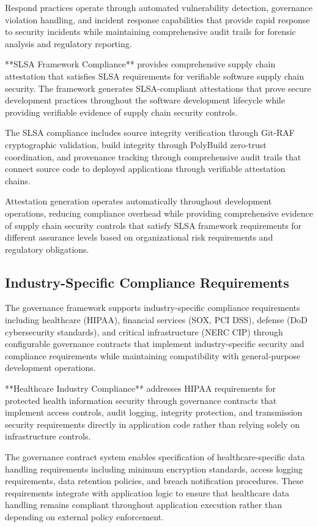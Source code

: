 Respond practices operate through automated vulnerability detection, governance violation handling, and incident response capabilities that provide rapid response to security incidents while maintaining comprehensive audit trails for forensic analysis and regulatory reporting.

**SLSA Framework Compliance** provides comprehensive supply chain attestation that satisfies SLSA requirements for verifiable software supply chain security. The framework generates SLSA-compliant attestations that prove secure development practices throughout the software development lifecycle while providing verifiable evidence of supply chain security controls.

The SLSA compliance includes source integrity verification through Git-RAF cryptographic validation, build integrity through PolyBuild zero-trust coordination, and provenance tracking through comprehensive audit trails that connect source code to deployed applications through verifiable attestation chains.

Attestation generation operates automatically throughout development operations, reducing compliance overhead while providing comprehensive evidence of supply chain security controls that satisfy SLSA framework requirements for different assurance levels based on organizational risk requirements and regulatory obligations.

\subsection{Industry-Specific Compliance Requirements}

The governance framework supports industry-specific compliance requirements including healthcare (HIPAA), financial services (SOX, PCI DSS), defense (DoD cybersecurity standards), and critical infrastructure (NERC CIP) through configurable governance contracts that implement industry-specific security and compliance requirements while maintaining compatibility with general-purpose development operations.

**Healthcare Industry Compliance** addresses HIPAA requirements for protected health information security through governance contracts that implement access controls, audit logging, integrity protection, and transmission security requirements directly in application code rather than relying solely on infrastructure controls.

The governance contract system enables specification of healthcare-specific data handling requirements including minimum encryption standards, access logging requirements, data retention policies, and breach notification procedures. These requirements integrate with application logic to ensure that healthcare data handling remains compliant throughout application execution rather than depending on external policy enforcement.

